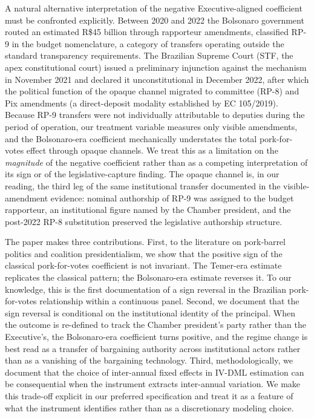 \documentclass[pdflatex,sn-basic]{sn-jnl}
\begin{document}
A natural alternative interpretation of the negative Executive-aligned coefficient must be confronted explicitly. Between 2020 and 2022 the Bolsonaro government routed an estimated R\$45 billion through rapporteur amendments, classified RP-9 in the budget nomenclature, a category of transfers operating outside the standard transparency requirements. The Brazilian Supreme Court (STF, the apex constitutional court) issued a preliminary injunction against the mechanism in November 2021 and declared it unconstitutional in December 2022, after which the political function of the opaque channel migrated to committee (RP-8) and Pix amendments (a direct-deposit modality established by EC 105/2019). Because RP-9 transfers were not individually attributable to deputies during the period of operation, our treatment variable measures only visible amendments, and the Bolsonaro-era coefficient mechanically understates the total pork-for-votes effect through opaque channels. We treat this as a limitation on the \emph{magnitude} of the negative coefficient rather than as a competing interpretation of its sign or of the legislative-capture finding. The opaque channel is, in our reading, the third leg of the same institutional transfer documented in the visible-amendment evidence: nominal authorship of RP-9 was assigned to the budget rapporteur, an institutional figure named by the Chamber president, and the post-2022 RP-8 substitution preserved the legislative authorship structure.

The paper makes three contributions. First, to the literature on pork-barrel politics and coalition presidentialism, we show that the positive sign of the classical pork-for-votes coefficient is not invariant. The Temer-era estimate replicates the classical \citet{PereiraAndMueller2004} pattern; the Bolsonaro-era estimate reverses it. To our knowledge, this is the first documentation of a sign reversal in the Brazilian pork-for-votes relationship within a continuous panel. Second, we document that the sign reversal is conditional on the institutional identity of the principal. When the outcome is re-defined to track the Chamber president's party rather than the Executive's, the Bolsonaro-era coefficient turns positive, and the regime change is best read as a transfer of bargaining authority across institutional actors rather than as a vanishing of the bargaining technology. Third, methodologically, we document that the choice of inter-annual fixed effects in IV-DML estimation can be consequential when the instrument extracts inter-annual variation. We make this trade-off explicit in our preferred specification and treat it as a feature of what the instrument identifies rather than as a discretionary modeling choice.
\end{document}
